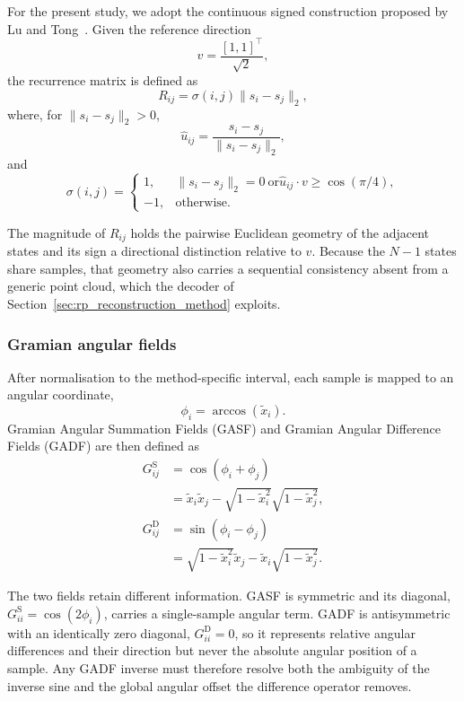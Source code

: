 \documentclass[preprint,12pt]{elsarticle}
\begin{document}
For the present study, we adopt the continuous signed construction proposed by Lu and Tong~\cite{lu2019robust}. Given the reference direction
\[
v=\frac{[1,1]^\top}{\sqrt{2}},
\]
the recurrence matrix is defined as
\begin{equation}
R_{ij}=\sigma(i,j)\lVert s_i-s_j\rVert_2,
\label{eq:FormulaRP}
\end{equation}
where, for \(\lVert s_i-s_j\rVert_2>0\),
\[
\hat u_{ij}=\frac{s_i-s_j}{\lVert s_i-s_j\rVert_2},
\]
and
\begin{equation}
\sigma(i,j)=
\begin{cases}
1,
&
\lVert s_i-s_j\rVert_2=0
\ \text{or}
\hat u_{ij}\cdot v\geq\cos(\pi/4),
\\
-1,
&
\text{otherwise}.
\end{cases}
\end{equation}

The magnitude of \(R_{ij}\) holds the pairwise Euclidean geometry of the adjacent states and its sign a directional distinction relative to \(v\). Because the \(N-1\) states share samples, that geometry also carries a sequential consistency absent from a generic point cloud, which the decoder of Section~\ref{sec:rp_reconstruction_method} exploits.

\subsubsection{Gramian angular fields}
\label{sec:gaf_encoding}

After normalisation to the method-specific interval, each sample is mapped to an angular coordinate,
\[
\phi_i=\arccos(\tilde{x}_i).
\]
Gramian Angular Summation Fields (GASF) and Gramian Angular Difference Fields (GADF) are then defined as~\cite{wang2015encoding}
\begin{align}
G^{\mathrm{S}}_{ij}
&=\cos(\phi_i+\phi_j) \nonumber\\
&=\tilde{x}_i\tilde{x}_j
-\sqrt{1-\tilde{x}_i^2}\sqrt{1-\tilde{x}_j^2},
\label{eq:gasf_indexed}
\\
G^{\mathrm{D}}_{ij}
&=\sin(\phi_i-\phi_j) \nonumber\\
&=\sqrt{1-\tilde{x}_i^2}\tilde{x}_j
-\tilde{x}_i\sqrt{1-\tilde{x}_j^2}.
\label{eq:gadf_indexed}
\end{align}

The two fields retain different information. GASF is symmetric and its diagonal, \(G^{\mathrm{S}}_{ii}=\cos(2\phi_i)\), carries a single-sample angular term. GADF is antisymmetric with an identically zero diagonal, \(G^{\mathrm{D}}_{ii}=0\), so it represents relative angular differences and their direction but never the absolute angular position of a sample. Any GADF inverse must therefore resolve both the ambiguity of the inverse sine and the global angular offset the difference operator removes.
\end{document}
